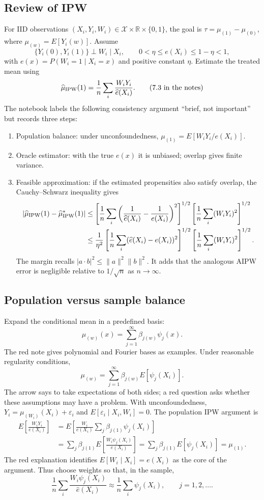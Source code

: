 \subsection{Review of IPW}
For IID observations $(X_i,Y_i,W_i)\in\mathcal X\times\mathbb R\times\{0,1\}$, the goal is $\tau=\mu_{(1)}-\mu_{(0)}$, where $\mu_{(w)}=E[Y_i(w)]$. Assume
\[
\{Y_i(0),Y_i(1)\}\perp W_i\mid X_i,\qquad
0<\eta\leq e(X_i)\leq1-\eta<1,
\]
with $e(x)=P(W_i=1\mid X_i=x)$ and positive constant $\eta$. Estimate the treated mean using
\[
\widehat\mu_{\rm IPW}(1)=\frac1n\sum_i\frac{W_iY_i}{\widehat e(X_i)}.
\tag{7.3 in the notes}
\]
The notebook labels the following consistency argument ``brief, not important'' but records three steps:
\begin{enumerate}
\item Population balance: under unconfoundedness, $\mu_{(1)}=E[W_iY_i/e(X_i)]$.
\item Oracle estimator: with the true $e(x)$ it is unbiased; overlap gives finite variance.
\item Feasible approximation: if the estimated propensities also satisfy overlap, the Cauchy--Schwarz inequality gives
\begin{align*}
|\widehat\mu_{\rm IPW}(1)-\widehat\mu^*_{\rm IPW}(1)|
&\leq\left[\frac1n\sum_i\left(\frac1{\widehat e(X_i)}-\frac1{e(X_i)}\right)^2\right]^{1/2}
\left[\frac1n\sum_i(W_iY_i)^2\right]^{1/2}\\
&\leq\frac1{\eta^2}\left[\frac1n\sum_i(\widehat e(X_i)-e(X_i))^2\right]^{1/2}
\left[\frac1n\sum_i(W_iY_i)^2\right]^{1/2}.
\end{align*}
The margin recalls $|a\cdot b|^2\leq\|a\|^2\|b\|^2$. It adds that the analogous AIPW error is negligible relative to $1/\sqrt n$ as $n\to\infty$.
\end{enumerate}
\subsection{Population versus sample balance}
Expand the conditional mean in a predefined basis:
\[
\mu_{(w)}(x)=\sum_{j=1}^\infty\beta_{j(w)}\psi_j(x).
\]
The red note gives polynomial and Fourier bases as examples. Under reasonable regularity conditions,
\[
\mu_{(w)}=\sum_{j=1}^\infty\beta_{j(w)}E[\psi_j(X_i)].
\]
The arrow says to take expectations of both sides; a red question asks whether these assumptions may have a problem.
With unconfoundedness, $Y_i=\mu_{(W_i)}(X_i)+\varepsilon_i$ and $E[\varepsilon_i\mid X_i,W_i]=0$. The population IPW argument is
\begin{align*}
E\left[\frac{W_iY_i}{e(X_i)}\right]
&=E\left[\frac{W_i}{e(X_i)}\sum_j\beta_{j(1)}\psi_j(X_i)\right]\\
&=\sum_j\beta_{j(1)}E\left[\frac{W_i\psi_j(X_i)}{e(X_i)}\right]
=\sum_j\beta_{j(1)}E[\psi_j(X_i)]=\mu_{(1)}.
\end{align*}
The red explanation identifies $E[W_i\mid X_i]=e(X_i)$ as the core of the argument. Thus choose weights so that, in the sample,
\[
\frac1n\sum_i\frac{W_i\psi_j(X_i)}{\widehat e(X_i)}
\approx\frac1n\sum_i\psi_j(X_i),\qquad j=1,2,\ldots.
\tag{7.8 in the notes}
\]
